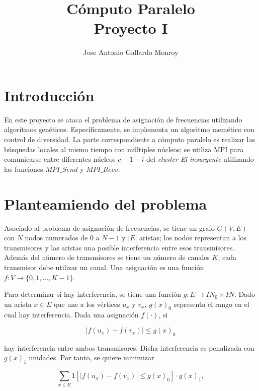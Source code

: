 \documentclass[10pt,a4paper]{article}
\begin{document}
\title{Cómputo Paralelo\\Proyecto I}
\author{Jose Antonio Gallardo Monroy}

\maketitle

\section{Introducción}

\noindent En este proyecto se ataca el problema de asignación de frecuencias utilizando algoritmos genéticos. Específicamente, se implementa un algoritmo memético con control de diversidad. La parte correspondiente a cómputo paralelo es realizar las búsquedas locales al mismo tiempo con múltiples núcleos; se utiliza MPI para comunicarse entre diferentes núcleos $c-1-i$ del \textit{cluster El insurgente} utilizando las funciones $MPI\_Send$ y $MPI\_Recv$.


\section{Planteamiendo del problema}

\noindent Asociado al problema de asignación de frecuencias, se tiene un grafo $G(V, E)$ con $N$ nodos numerados de $0$ a $N-1$ y $|E|$ aristas; los nodos representan a los transmisores y las aristas una posible interferencia entre esos transmisores. Además del número de transmisores se tiene un número de canales $K$; cada transmisor debe utilizar un canal. Una asignación es una función $f:V \rightarrow  \{0, 1, \dots, K-1 \}$.

\noindent Para determinar si hay interferencia, se tiene una función $g: E \rightarrow I\!\!N_0 \times I\!\!N$. Dado un arista $x \in E$ que une a los vértices $u_x$ y $v_x$, $g(x)_0$ representa el rango en el cual hay interferencia. Dada una asignación $f(\cdot)$, si

\begin{equation*}
| f(u_x) - f(v_x) | \leq g(x)_0 
\end{equation*}

\noindent hay interferencia entre ambos transmisores. Dicha interferencia es penalizada con $g(x)_1$ unidades. Por tanto, se quiere minimizar

\begin{equation*}
\sum_{x \in E} 1\left[ | f(u_x) - f(v_x) | \leq g(x)_0 \right] \cdot g(x)_1, 
\end{equation*}
\end{document}
